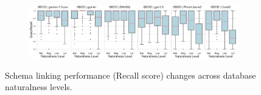 \begin{figure}
\begin{subfigure}{\textwidth}
    \end{subfigure}
    \begin{subfigure}{\textwidth}
      \centering
      \includegraphics[width=\textwidth]{figures/natlevel-boxplots/natlevel-model-recall-boxplot-SBOD.pdf}
    \end{subfigure}
    \caption{Schema linking performance (Recall score) changes across database naturalness levels.}
    \label{fig:db-level-boxplots-recall-2}
  \end{figure}
  




